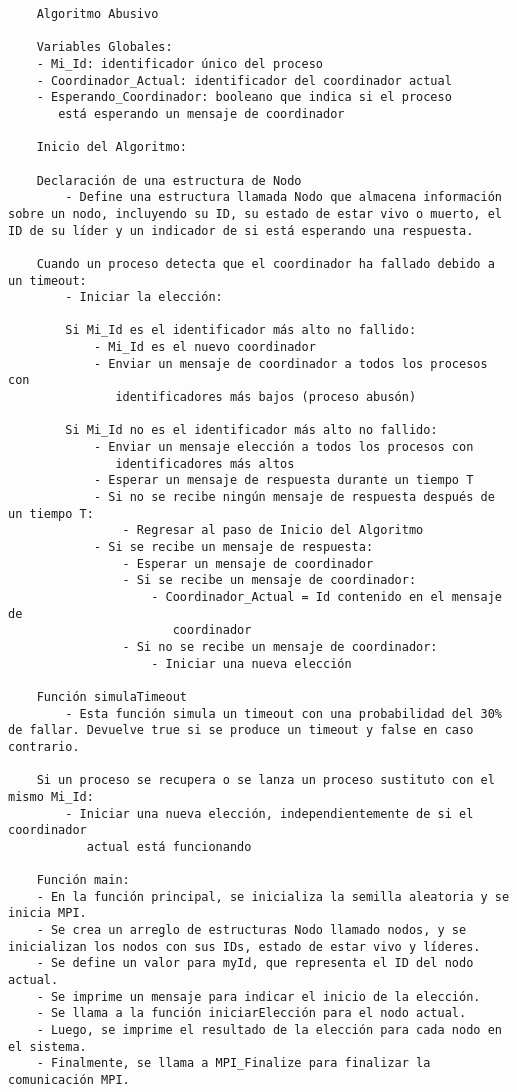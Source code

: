 \documentclass[a4paper,12pt]{article}
\begin{document}
\begin{verbatim}
    Algoritmo Abusivo

    Variables Globales:
    - Mi_Id: identificador único del proceso
    - Coordinador_Actual: identificador del coordinador actual
    - Esperando_Coordinador: booleano que indica si el proceso 
       está esperando un mensaje de coordinador
    
    Inicio del Algoritmo:

    Declaración de una estructura de Nodo 
        - Define una estructura llamada Nodo que almacena información sobre un nodo, incluyendo su ID, su estado de estar vivo o muerto, el ID de su líder y un indicador de si está esperando una respuesta.
    
    Cuando un proceso detecta que el coordinador ha fallado debido a un timeout:
        - Iniciar la elección:
        
        Si Mi_Id es el identificador más alto no fallido:
            - Mi_Id es el nuevo coordinador
            - Enviar un mensaje de coordinador a todos los procesos con 
               identificadores más bajos (proceso abusón)
    
        Si Mi_Id no es el identificador más alto no fallido:
            - Enviar un mensaje elección a todos los procesos con 
               identificadores más altos
            - Esperar un mensaje de respuesta durante un tiempo T
            - Si no se recibe ningún mensaje de respuesta después de un tiempo T:
                - Regresar al paso de Inicio del Algoritmo
            - Si se recibe un mensaje de respuesta:
                - Esperar un mensaje de coordinador
                - Si se recibe un mensaje de coordinador:
                    - Coordinador_Actual = Id contenido en el mensaje de 
                       coordinador
                - Si no se recibe un mensaje de coordinador:
                    - Iniciar una nueva elección

    Función simulaTimeout
        - Esta función simula un timeout con una probabilidad del 30% de fallar. Devuelve true si se produce un timeout y false en caso contrario.
    
    Si un proceso se recupera o se lanza un proceso sustituto con el mismo Mi_Id:
        - Iniciar una nueva elección, independientemente de si el coordinador 
           actual está funcionando

    Función main:
    - En la función principal, se inicializa la semilla aleatoria y se inicia MPI.
    - Se crea un arreglo de estructuras Nodo llamado nodos, y se inicializan los nodos con sus IDs, estado de estar vivo y líderes.
    - Se define un valor para myId, que representa el ID del nodo actual.
    - Se imprime un mensaje para indicar el inicio de la elección.
    - Se llama a la función iniciarElección para el nodo actual.
    - Luego, se imprime el resultado de la elección para cada nodo en el sistema.
    - Finalmente, se llama a MPI_Finalize para finalizar la comunicación MPI.
\end{verbatim}

\end{document}
